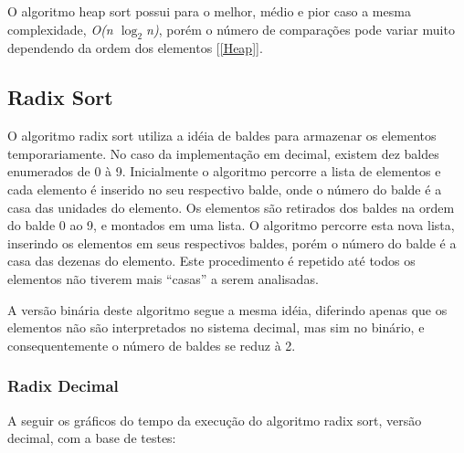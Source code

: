 \documentclass[fleqn,10pt]{SelfArx} %
\begin{document}
{\setlength{\parindent}{-0.5em}
}\newline

O algoritmo heap sort possui para o melhor, médio e pior caso a mesma complexidade, \emph{O(n $\log_2$n)}, porém 
o número de comparações pode variar muito dependendo da ordem dos elementos [\ref{Heap}].

\subsection{Radix Sort}

O algoritmo radix sort utiliza a idéia de baldes para armazenar os elementos temporariamente. No caso da implementação em 
decimal, existem dez baldes enumerados de 0 à 9. Inicialmente o algoritmo percorre a lista de elementos e cada elemento é 
inserido no seu respectivo balde, onde o número do balde é a casa das unidades do elemento. Os elementos são retirados dos 
baldes na ordem do balde 0 ao 9, e montados em uma lista. O algoritmo percorre esta nova lista, inserindo os elementos 
em seus respectivos baldes, porém o número do balde é a casa das dezenas do elemento. Este procedimento é repetido até 
todos os elementos não tiverem mais ``casas'' a serem analisadas.

A versão binária deste algoritmo segue a mesma idéia, diferindo apenas que os elementos não são interpretados no sistema 
decimal, mas sim no binário, e consequentemente o número de baldes se reduz à 2.

\subsubsection*{Radix Decimal}

A seguir os gráficos do tempo da execução do algoritmo radix sort, versão decimal, com a base de testes:\newline

{\setlength{\parindent}{-0.5em}
}\newline
\end{document}
